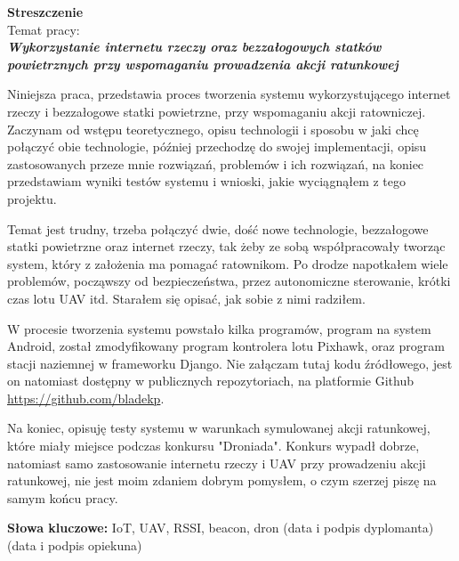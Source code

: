 \newpage
\begin{center}
 {\large\bf  Streszczenie} \\
\vskip 1cm
Temat pracy:\\
\textit{\bf Wykorzystanie internetu rzeczy oraz bezzałogowych
statków powietrznych przy wspomaganiu prowadzenia
akcji ratunkowej}\\
\end{center}

Niniejsza praca, przedstawia proces tworzenia systemu wykorzystującego internet rzeczy i bezzałogowe statki powietrzne, przy wspomaganiu akcji ratowniczej. Zaczynam od wstępu teoretycznego, opisu technologii i sposobu w jaki chcę połączyć obie technologie, później przechodzę do swojej implementacji, opisu zastosowanych przeze mnie rozwiązań, problemów i ich rozwiązań, na koniec przedstawiam wyniki testów systemu i wnioski, jakie wyciągnąłem z tego projektu.

Temat jest trudny, trzeba połączyć dwie, dość nowe technologie, bezzałogowe statki powietrzne oraz internet rzeczy, tak żeby ze sobą współpracowały tworząc system, który z założenia ma pomagać ratownikom. Po drodze napotkałem wiele problemów, począwszy od bezpieczeństwa, przez autonomiczne sterowanie, krótki czas lotu UAV itd. Starałem się opisać, jak sobie z nimi radziłem.

W procesie tworzenia systemu powstało kilka programów, program na system Android, został zmodyfikowany program kontrolera lotu Pixhawk, oraz program stacji naziemnej w frameworku Django. Nie załączam tutaj kodu źródłowego, jest on natomiast dostępny w publicznych repozytoriach, na platformie Github \url{https://github.com/bladekp}. 

Na koniec, opisuję testy systemu w warunkach symulowanej akcji ratunkowej, które miały miejsce podczas konkursu "Droniada". Konkurs wypadł dobrze, natomiast samo zastosowanie internetu rzeczy i UAV przy prowadzeniu akcji ratunkowej, nie jest moim zdaniem dobrym pomysłem, o czym szerzej piszę na samym końcu pracy.

\vskip 2cm
\noindent
\textbf{Słowa kluczowe:} IoT, UAV, RSSI, beacon, dron
\vskip 2cm
\noindent
(data i podpis dyplomanta)\hfill (data i podpis opiekuna)
